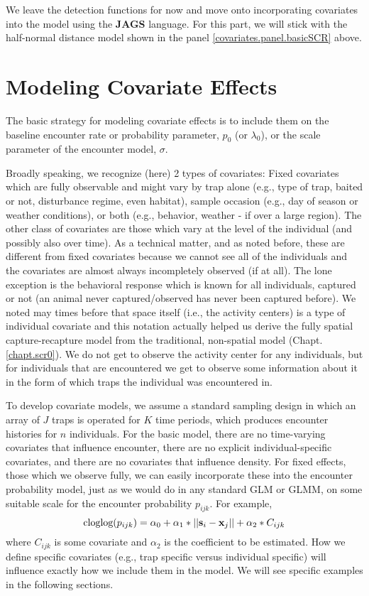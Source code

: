 We leave the detection functions for now and move onto incorporating
covariates into the model using the {\bf JAGS}
language.  For this part, we will stick with the half-normal distance
model shown in the panel \ref{covariates.panel.basicSCR} above.


\section{Modeling Covariate Effects}


The basic strategy for modeling covariate effects is to include them
on the baseline encounter rate or probability parameter, $p_{0}$ (or
$\lambda_{0}$), or the scale parameter of the encounter model,
$\sigma$.

Broadly speaking, we recognize (here) 2 types of covariates: Fixed
covariates which are fully observable and might vary by trap alone
(e.g., type of trap, baited or not, disturbance regime, even habitat),
sample occasion (e.g., day of season or weather conditions), or both
(e.g., behavior, weather - if over a large region).  The other class
of covariates are those which vary at the level of the individual (and
possibly also over time).  As a technical matter, and as noted before,
these are different from fixed covariates because we cannot see all of
the individuals and the covariates are almost always incompletely
observed (if at all).  The lone exception is the behavioral response
which is known for all individuals, captured or not (an animal never
captured/observed has never been captured before).  We noted may times
before that space itself (i.e., the activity centers) is a type of
individual covariate and this notation actually helped us derive the
fully spatial capture-recapture model from the traditional,
non-spatial model (Chapt. \ref{chapt.scr0}). We do not get to observe
the activity center for any individuals, but for individuals that are
encountered we get to observe some information about it in the form of
which traps the individual was encountered in.


To develop covariate models, we assume a standard sampling design in which an
array of $J$ traps is operated for $K$ time periods, which produces
encounter histories for $n$ individuals.  For the basic model, there
are no time-varying covariates that influence encounter, there are no
explicit individual-specific covariates, and there are no covariates
that influence density.  For fixed effects, those which we observe
fully, we can easily incorporate these into the encounter probability
model, just as we would do in any standard GLM or GLMM, on some
suitable scale for the encounter probability $p_{ijk}$. For example,
\[
\mbox{cloglog}(p_{ijk}) = \alpha_0 + \alpha_1*||{\bf s}_{i}-{\bf x}_{j}|| +
\alpha_2*C_{ijk}
\]
where $C_{ijk}$ is some covariate and
$\alpha_2$ is the coefficient to be estimated.
 How we define specific covariates (e.g., trap specific
versus individual specific) will influence exactly how we include them
in the model. We will see specific examples in the following sections.  


